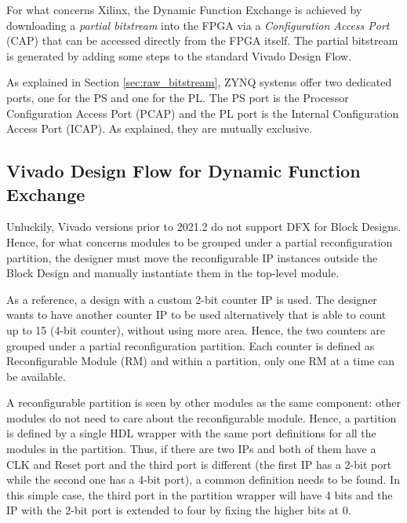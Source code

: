 For what concerns Xilinx, the Dynamic Function Exchange is achieved by downloading a \textit{partial bitstream} into the FPGA via a \textit{Configuration Access Port} (CAP) that can be accessed directly from the FPGA itself. The partial bitstream is generated by adding some steps to the standard Vivado Design Flow. \bigskip

As explained in Section \ref{sec:raw_bitstream}, ZYNQ systems offer two dedicated ports, one for the PS and one for the PL. The PS port is the Processor Configuration Access Port (PCAP) and the PL port is the Internal Configuration Access Port (ICAP). As explained, they are mutually exclusive. 


\subsection{Vivado Design Flow for Dynamic Function Exchange}

Unluckily, Vivado versions prior to 2021.2 do not support DFX for Block Designs. Hence, for what concerns modules to be grouped under a partial reconfiguration partition, the designer must move the reconfigurable IP instances outside the Block Design and manually instantiate them in the top-level module. \bigskip

As a reference, a design with a custom 2-bit counter IP is used. The designer wants to have another counter IP to be used alternatively that is able to count up to 15 (4-bit counter), without using more area. Hence, the two counters are grouped under a partial reconfiguration partition. Each counter is defined as Reconfigurable Module (RM) and within a partition, only one RM at a time can be available. \bigskip

A reconfigurable partition is seen by other modules as the same component: other modules do not need to care about the reconfigurable module. Hence, a partition is defined by a single HDL wrapper with the same port definitions for all the modules in the partition. Thus, if there are two IPs and both of them have a CLK and Reset port and the third port is different (the first IP has a 2-bit port while the second one has a 4-bit port), a common definition needs to be found. In this simple case, the third port in the partition wrapper will have 4 bits and the IP with the 2-bit port is extended to four by fixing the higher bits at 0.\bigskip 

